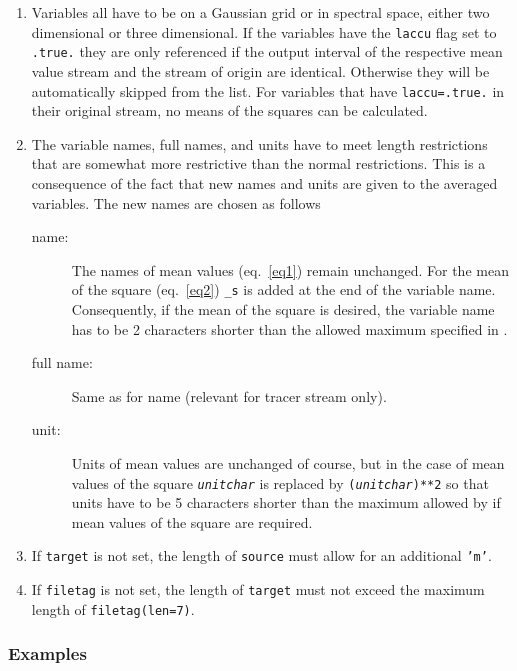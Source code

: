 \begin{appendix}
\begin{enumerate}
\item
\label{applicable_vars}

Variables all have to be on a Gaussian grid or in spectral space,
either two dimensional or three dimensional. If the variables have the
{\tt laccu} flag set to {\tt .true.} they are only referenced if the output
interval of the respective mean value stream and the stream of origin
are identical. Otherwise they will be automatically skipped from the list.
For variables that have {\tt laccu=.true.} in their original stream,
no means of the squares can be calculated.

\item

The variable names, full names, and units have to meet
length restrictions that are somewhat more restrictive than the normal \echam{} 
restrictions. This is a consequence of the fact that
new names and units are given to the averaged
variables. The new names are chosen as follows
\begin{description}
\item [name:] The names of mean values (eq.~\ref{eq1}) remain unchanged. 
For the mean of the
square (eq.~\ref{eq2}) {\tt \_s} is 
added at the end of the variable name. Consequently, if the mean of the 
square is desired, the variable name has to be 2 characters shorter than the
allowed maximum specified in \echam.
\item [full name:] Same as for name (relevant for tracer stream only).
\item [unit:] Units of mean values are unchanged of course, but in the case of
mean values of the square {\tt \it unitchar} is replaced by 
{\tt ({\it unitchar})**2} so that units have to be 5 characters shorter than
the maximum allowed by \echam{} if mean values of the square are required.
\end{description}

\item If \texttt{target} is not set,
      the length of \texttt{source} must 
      allow for an additional {\tt 'm'}.

\item If \texttt{filetag} is not set, the length of \texttt{target}
  must not exceed the maximum length of \texttt{filetag(len=7)}. 
\end{enumerate}



\subsubsection{Examples}


\end{appendix}
